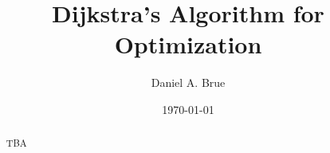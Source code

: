 \documentclass[preprint]{article}
\begin{document}
\title{Dijkstra's Algorithm for Optimization}
\author{Daniel A. Brue}
\date{\today}
\begin{abstract}
TBA
\end{abstract}

\maketitle
\end{document}
